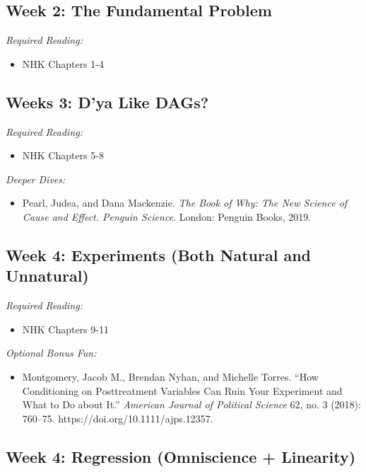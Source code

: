 \documentclass[11pt, letterpaper]{article}
\begin{document}
\subsection*{Week 2: The Fundamental Problem}

\textit{Required Reading:}

\begin{itemize}
	\item NHK Chapters 1-4
\end{itemize}

\subsection*{Weeks 3: D'ya Like DAGs?}

\textit{Required Reading:}

\begin{itemize}
	\item NHK Chapters 5-8
\end{itemize}

\noindent \textit{Deeper Dives:}

\begin{itemize}
	\item Pearl, Judea, and Dana Mackenzie. \textit{The Book of Why: The New Science of Cause and Effect. Penguin Science}. London: Penguin Books, 2019.
\end{itemize}

\subsection*{Week 4: Experiments (Both Natural and Unnatural)}

\textit{Required Reading:}

\begin{itemize}
	\item NHK Chapters 9-11
\end{itemize}

\noindent \textit{Optional Bonus Fun:}

\begin{itemize}
	\item Montgomery, Jacob M., Brendan Nyhan, and Michelle Torres. ``How Conditioning on Posttreatment Variables Can Ruin Your Experiment and What to Do about It.'' \textit{American Journal of Political Science} 62, no. 3 (2018): 760–75. https://doi.org/10.1111/ajps.12357.
\end{itemize}

\subsection*{Week 4: Regression (Omniscience + Linearity)}
\end{document}
